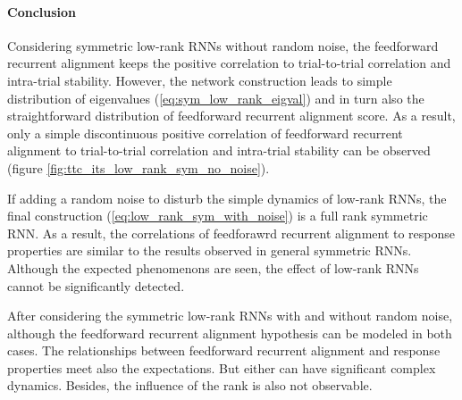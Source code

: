 \documentclass[11pt]{article}
\begin{document}
	
	\paragraph{Conclusion}
	
	Considering symmetric low-rank RNNs without random noise, the feedforward recurrent alignment keeps the positive correlation to trial-to-trial correlation and intra-trial stability. However, the network construction leads to simple distribution of eigenvalues (\ref{eq:sym_low_rank_eigval}) and in turn also the straightforward distribution of feedforward recurrent alignment score. As a result, only a simple discontinuous positive correlation of feedforward recurrent alignment to trial-to-trial correlation and intra-trial stability can be observed (figure \ref{fig:ttc_its_low_rank_sym_no_noise}). 
	
	If adding a random noise to disturb the simple dynamics of low-rank RNNs, the final construction (\ref{eq:low_rank_sym_with_noise}) is a full rank symmetric RNN. As a result, the correlations of feedforawrd recurrent alignment to response properties are similar to the results observed in general symmetric RNNs. Although the expected phenomenons are seen, the effect of low-rank RNNs cannot be significantly detected. 
	
	After considering the symmetric low-rank RNNs with and without random noise, although the feedforward recurrent alignment hypothesis can be modeled in both cases. The relationships between feedforward recurrent alignment and response properties meet also the expectations. But either can have significant complex dynamics. Besides, the influence of the rank is also not observable. 
	
\end{document}
